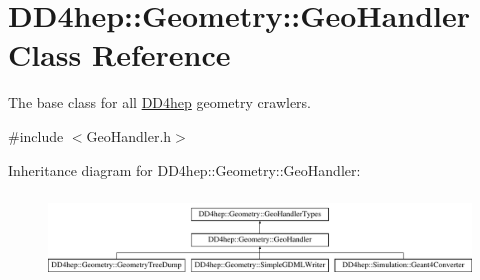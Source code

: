 \hypertarget{class_d_d4hep_1_1_geometry_1_1_geo_handler}{}\section{D\+D4hep\+:\+:Geometry\+:\+:Geo\+Handler Class Reference}
\label{class_d_d4hep_1_1_geometry_1_1_geo_handler}


The base class for all \hyperlink{namespace_d_d4hep}{D\+D4hep} geometry crawlers.  




{\ttfamily \#include $<$Geo\+Handler.\+h$>$}

Inheritance diagram for D\+D4hep\+:\+:Geometry\+:\+:Geo\+Handler\+:\begin{figure}[H]
\begin{center}
\leavevmode
\includegraphics[height=2.295082cm]{class_d_d4hep_1_1_geometry_1_1_geo_handler}
\end{center}
\end{figure}
